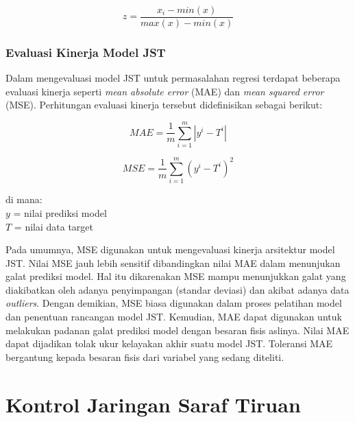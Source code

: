 \begin{equation} \label{eq:3:MinMaxScaler}
z = \frac{x_i - min(x)}{max(x) - min(x)}
\end{equation}

\subsubsection{Evaluasi Kinerja Model JST}

Dalam mengevaluasi model JST untuk permasalahan regresi terdapat beberapa evaluasi kinerja seperti \textit{mean absolute error} (MAE) dan \textit{mean squared error} (MSE). Perhitungan evaluasi kinerja tersebut didefinisikan sebagai berikut:

\begin{equation} \label{eq:3:MAEequation}
	MAE = \frac{1}{m} \sum_{i=1}^{m} |y^i-T^i|
\end{equation}

\begin{equation} \label{eq:3:MSEequation}
	MSE = \frac{1}{m} \sum_{i=1}^{m} (y^i-T^i)^2
\end{equation}

\noindent di mana:\\
$y$ = nilai prediksi model\\
$T$ = nilai data target

Pada umumnya, MSE digunakan untuk mengevaluasi kinerja arsitektur model JST. Nilai MSE jauh lebih sensitif dibandingkan nilai MAE dalam menunjukan galat prediksi model. Hal itu dikarenakan MSE mampu menunjukkan galat yang diakibatkan oleh adanya penyimpangan (standar deviasi) dan akibat adanya data \textit{outliers}. Dengan demikian, MSE biasa digunakan dalam proses pelatihan model dan penentuan rancangan model JST. Kemudian, MAE dapat digunakan untuk melakukan padanan galat prediksi model dengan besaran fisis aslinya. Nilai MAE dapat dijadikan tolak ukur kelayakan akhir suatu model JST. Toleransi MAE bergantung kepada besaran fisis dari variabel yang sedang diteliti. \cite{HandsOnML}

\section{Kontrol Jaringan Saraf Tiruan}

